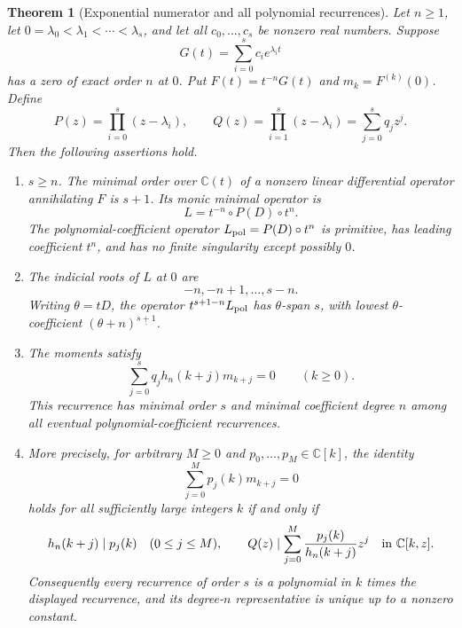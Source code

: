 \documentclass[11pt]{article}
\newtheorem{theorem}{Theorem}[section]
\theoremstyle{definition}
\theoremstyle{remark}
\numberwithin{equation}{section}
\begin{document}
\begin{theorem}[Exponential numerator and all polynomial recurrences]
\label{thm:exponential-numerator}
Let $n\ge1$, let
$0=\lambda_0<\lambda_1<\cdots<\lambda_s$, and let all
$c_0,\ldots,c_s$ be nonzero real numbers. Suppose
\[
 G(t)=\sum_{i=0}^s c_i e^{\lambda_i t}
\]
has a zero of exact order $n$ at $0$. Put $F(t)=t^{-n}G(t)$ and
$m_k=F^{(k)}(0)$. Define
\[
 P(z)=\prod_{i=0}^s(z-\lambda_i),\qquad
 Q(z)=\prod_{i=1}^s(z-\lambda_i)=\sum_{j=0}^s q_jz^j.
\]
Then the following assertions hold.
\begin{enumerate}
\item $s\ge n$. The minimal order over $\mathbb C(t)$ of a nonzero
linear differential operator annihilating $F$ is $s+1$. Its monic
minimal operator is
\[
 L=t^{-n}\circ P(D)\circ t^n.
\]
The polynomial-coefficient operator
$L_{\rm pol}=P(D)\circ t^n$ is primitive, has leading coefficient
$t^n$, and has no finite singularity except possibly $0$.
\item The indicial roots of $L$ at $0$ are
\[
 -n,-n+1,\ldots,s-n.
\]
Writing $\theta=tD$, the operator
$t^{s+1-n}L_{\rm pol}$ has $\theta$-span $s$, with lowest
$\theta$-coefficient $(\theta+n)^{\underline{s+1}}$.
\item The moments satisfy
\[
 \sum_{j=0}^s q_j h_n(k+j)m_{k+j}=0\qquad(k\ge0).
\]
This recurrence has minimal order $s$ and minimal coefficient degree
$n$ among all eventual polynomial-coefficient recurrences.
\item More precisely, for arbitrary $M\ge0$ and
$p_0,\ldots,p_M\in\mathbb C[k]$, the identity
\[
 \sum_{j=0}^M p_j(k)m_{k+j}=0
\]
holds for all sufficiently large integers $k$ if and only if
\[
 h_n(k+j)\mid p_j(k)\quad(0\le j\le M),\qquad
 Q(z)\mid\sum_{j=0}^M\frac{p_j(k)}{h_n(k+j)}z^j
       \quad\hbox{in }\mathbb C[k,z].
\]
Consequently every recurrence of order $s$ is a polynomial in $k$
times the displayed recurrence, and its degree-$n$ representative is
unique up to a nonzero constant.
\end{enumerate}
\end{theorem}
\end{document}
